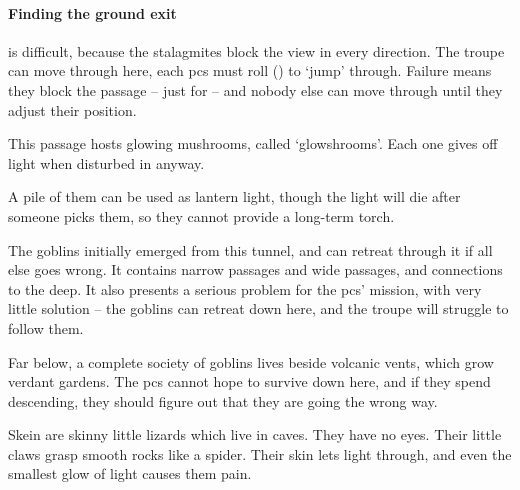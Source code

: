 \begin{multicols}{2}
\paragraph{Finding the ground exit}
is difficult, because the stalagmites block the view in every direction.
The troupe can move through here, each \glspl{pc} must roll  (\tn[10]) to `jump' through.
Failure means they block the passage -- just for  -- and nobody else can move through until they adjust their position.




This passage hosts glowing mushrooms, called `\glspl{glowshroom}'.
Each one gives off light when disturbed in anyway.

A pile of them can be used as lantern light, though the light will die after  someone picks them, so they cannot provide a long-term torch.




The goblins initially emerged from this tunnel, and can retreat through it if all else goes wrong.
It contains narrow passages and wide passages, and connections to the \gls{deep}.
It also presents a serious problem for the \glspl{pc}' mission, with very little solution -- the goblins can retreat down here, and the troupe will struggle to follow them.

Far below, a complete society of goblins lives beside volcanic vents, which grow verdant gardens.
The \glspl{pc} cannot hope to survive down here, and if they spend  descending, they should figure out that they are going the wrong way.


\begin{exampletext}
  Skein are skinny little lizards which live in caves.
  They have no eyes.
  Their little claws grasp smooth rocks like a spider.
  Their skin lets light through, and even the smallest glow of light causes them pain.
\end{exampletext}


\end{multicols}
